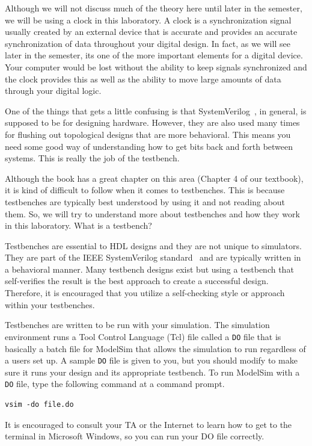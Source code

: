 \documentclass{article}
\begin{document}
Although we will not discuss much of the theory here until later
in the semester, we will be using a clock in this laboratory.  A clock
is a synchronization signal usually created by an external device that
is accurate and provides an accurate synchronization of data
throughout your digital design.  In fact, as we will see later in the
semester, its one of the more important elements for a digital
device.  Your computer would be lost without the ability to keep
signals synchronized and the clock provides this as well as the
ability to move large amounts of data through your digital logic.

One of the things that gets a little confusing is that
SystemVerilog~\cite{5354441},
in general, is supposed to be for designing hardware.
However, they are also used many times for flushing
out topological designs
that are more behavioral.  This means you need some good way of
understanding how to get bits back and forth between systems. This is
really the job of the testbench.

Although the book has a great chapter on this area (Chapter 4 of our
textbook), it is kind of difficult to follow when it comes to
testbenches.  This is because testbenches are typically best
understood by using it and not reading about them.  So, we will try to
understand more about testbenches and how they work in this
laboratory.  What is a testbench?

Testbenches are essential to HDL designs and they are not unique to
simulators.  They are part of the IEEE SystemVerilog
standard~\cite{5354441} and are typically
written in a behavioral manner.
Many testbench designs exist but using a
testbench that self-verifies the result is the best approach to create a
successful design. Therefore, it is encouraged that you utilize a
self-checking style or approach within your testbenches.

Testbenches are written to be run with your simulation.  
The simulation environment runs a Tool Control Language (Tcl) file
called a \verb+DO+ file
that is basically a batch file for ModelSim that allows the simulation
to run regardless of a users set up.  A sample \verb+DO+ file is given
to you, but you should modify to make sure it runs your 
design and its appropriate testbench.  To run ModelSim with a
\verb+DO+ file, type the following command at a command prompt.
\begin{verbatim}
vsim -do file.do
\end{verbatim}
It is encouraged to consult your TA or the Internet to learn how to get to
the terminal in Microsoft Windows, so you can run your DO file
correctly.
\end{document}
